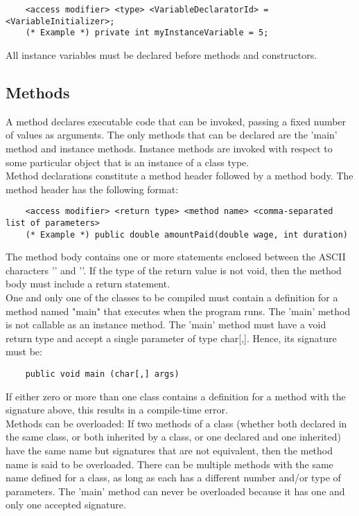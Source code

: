 \begin{homeworkProblem}
\begin{verbatim}
	<access modifier> <type> <VariableDeclaratorId> = <VariableInitializer>;
	(* Example *) private int myInstanceVariable = 5;
	\end{verbatim}

	All instance variables must be declared before methods and constructors. 
	
	\subsection{Methods}
	A method declares executable code that can be invoked, passing a fixed number of values as arguments. The only methods that can be declared are the 'main' method and instance methods. Instance methods are invoked with respect to some particular object that is an instance of a class type.\\
	
	Method declarations constitute a method header followed by a method body. The method header has the following format:
	\begin{verbatim}
	<access modifier> <return type> <method name> <comma-separated list of parameters>
	(* Example *) public double amountPaid(double wage, int duration)
	\end{verbatim}
	
	The method body contains one or more statements enclosed between the ASCII characters '\textbraceleft' and '\textbraceright'. If the type of the return value is not void, then the method body must include a return statement.\\
	
	One and only one of the classes to be compiled must contain a definition for a method named "main" that executes when the program runs. The 'main' method is not callable as an instance method. The 'main' method must have a void return type and accept a single parameter of type char[,]. Hence, its signature must be:
	\begin{verbatim}
	public void main (char[,] args)
	\end{verbatim}
	
	If either zero or more than one class contains a definition for a method with the signature above, this results in a compile-time error.\\
	
	Methods can be overloaded: If two methods of a class (whether both declared in the same class, or both inherited by a class, or one declared and one inherited) have the same name but signatures that are not equivalent, then the method name is said to be overloaded. There can be multiple methods with the same name defined for a class, as long as each has a different number and/or type of parameters. The 'main' method can never be overloaded because it has one and only one accepted signature.\\
	

\end{homeworkProblem}
